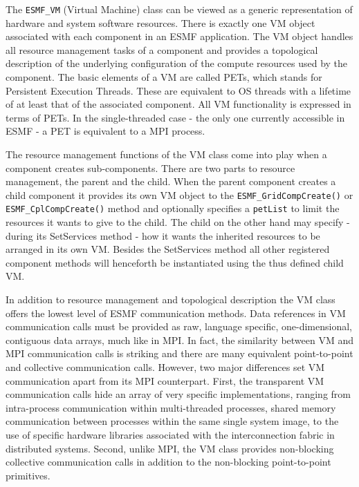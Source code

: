 
The {\tt ESMF\_VM} (Virtual Machine) class can be viewed as a generic representation of hardware and system software resources. There is exactly one VM object associated with each component in an ESMF application. The VM object handles all resource management tasks of a component and provides a topological description of the underlying configuration of the compute resources used by the component. The basic elements of a VM are called PETs, which stands for Persistent Execution Threads.  These are equivalent to OS threads with a lifetime of at least that of the associated component. All VM functionality is expressed in terms of PETs. In the single-threaded case - the only one currently accessible in ESMF - a PET is equivalent to a MPI process. 

The resource management functions of the VM class come into play when a component creates sub-components. There are two parts to resource management, the parent and the child. When the parent component creates a child component it provides its own VM object to the {\tt ESMF\_GridCompCreate()} or {\tt ESMF\_CplCompCreate()} method and optionally specifies a {\tt petList} to limit the resources it wants to give to the child. The child on the other hand may specify - during its SetServices method - how it wants the inherited resources to be arranged in its own VM. Besides the SetServices method all other registered component methods will henceforth be instantiated using the thus defined child VM.

In addition to resource management and topological description the VM class offers the lowest level of ESMF communication methods. Data references in VM communication calls must be provided as raw, language specific, one-dimensional, contiguous data arrays, much like in MPI. In fact, the similarity between VM and MPI communication calls is striking and there are many equivalent point-to-point and collective communication calls. However, two major differences set VM communication apart from its MPI counterpart. First, the transparent VM communication calls hide an array of very specific implementations, ranging from intra-process communication within multi-threaded processes, shared memory communication between processes within the same single system image, to the use of specific hardware libraries associated with the interconnection fabric in distributed systems. Second, unlike MPI, the VM class provides non-blocking collective communication calls in addition to the non-blocking point-to-point primitives.








